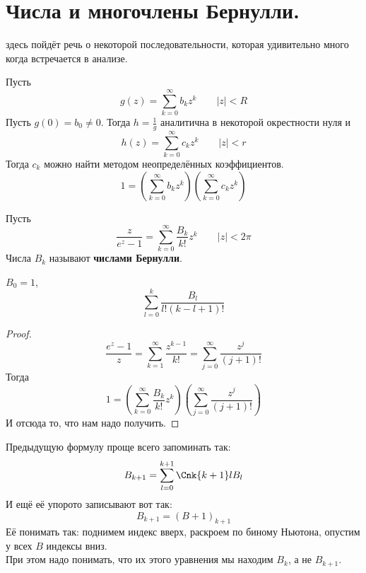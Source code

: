 \documentclass{article}
\begin{document}
    \section{Числа и многочлены Бернулли.}
    \begin{remark}
        здесь пойдёт речь о некоторой последовательности, которая удивительно много когда встречается в анализе.
    \end{remark}
    \begin{remark}
        Пусть $$g(z)=\sum\limits_{k=0}^\infty b_kz^k\qquad|z|<R$$
        Пусть $g(0)=b_0\neq0$. Тогда $h=\frac1g$ аналитична в некоторой окрестности нуля и
        $$
        h(z)=\sum\limits_{k=0}^\infty c_kz^k\qquad|z|<r
        $$
        Тогда $c_k$ можно найти методом неопределённых коэффициентов.
        $$
        1=\left(\sum\limits_{k=0}^\infty b_kz^k\right)\left(\sum\limits_{k=0}^\infty c_kz^k\right)
        $$
    \end{remark}
    \begin{definition}
        Пусть
        $$
        \frac z{e^z-1}=\sum\limits_{k=0}^\infty\frac{B_k}{k!}z^k\qquad|z|<2\pi
        $$
        Числа $B_k$ называют \textbf{числами Бернулли}.
    \end{definition}
    \begin{property}
        $B_0=1$,
        $$
        \sum\limits_{l=0}^k\frac{B_l}{l!(k-l+1)!}
        $$
    \end{property}
    \begin{proof}
        $$
        \frac{e^z-1}z=\sum\limits_{k=1}^\infty\frac{z^{k-1}}{k!}=\sum\limits_{j=0}^\infty\frac{z^j}{(j+1)!}
        $$
        Тогда
        $$
        1=\left(\sum\limits_{k=0}^\infty\frac{B_k}{k!}z^k\right)\left(\sum\limits_{j=0}^\infty\frac{z^j}{(j+1)!}\right)
        $$
        И отсюда то, что нам надо получить.
    \end{proof}
    \begin{remark}
        Предыдущую формулу проще всего запоминать так:
        $$B_{k+1}=\sum\limits_{l=0}^{k+1}\Cnk{k+1}lB_l$$
        И ещё её упорото записывают вот так:
        $$
        B_{k+1}=(B+1)_{k+1}
        $$
        Её понимать так: поднимем индекс вверх, раскроем по биному Ньютона, опустим у всех $B$ индексы вниз.\\
        При этом надо понимать, что их этого уравнения мы находим $B_k$, а не $B_{k+1}$.
    \end{remark}
\end{document}
